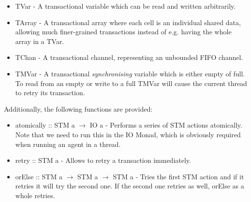 \begin{itemize}
	\item TVar - A transactional variable which can be read and written arbitrarily. 
	\item TArray - A transactional array where each cell is an individual shared data, allowing much finer-grained transactions instead of e.g. having the whole array in a TVar.
	\item TChan - A transactional channel, representing an unbounded FIFO channel.
	\item TMVar - A transactional \textit{synchronising} variable which is either empty of full. To read from an empty or write to a full TMVar will cause the current thread to retry its transaction.
\end{itemize}

Additionally, the following functions are provided:

\begin{itemize}
	\item atomically :: STM a $\to$ IO a - Performs a series of STM actions atomically. Note that we need to run this in the IO Monad, which is obviously required when running an agent in a thread.
	\item retry :: STM a - Allows to retry a transaction immediately.
	\item orElse :: STM a $\to$ STM a $\to$ STM a - Tries the first STM action and if it retries it will try the second one. If the second one retries as well, orElse as a whole retries.
\end{itemize}
